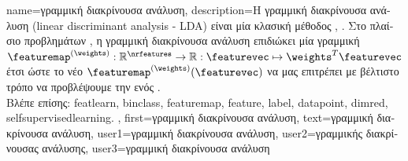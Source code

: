 {name={\foreignlanguage{greek}{γραμμική διακρίνουσα ανάλυση}}, 
	description={\foreignlanguage{greek}{Η γραμμική διακρίνουσα ανάλυση} 
		(linear discriminant analysis - LDA) \foreignlanguage{greek}{είναι μία κλασική μέθοδος}  
		\cite{BishopBook}, \cite{Fisher1936Taxonomic}. 
		\foreignlanguage{greek}{Στο πλαίσιο προβλημάτων} , \foreignlanguage{greek}{η γραμμική διακρίνουσα ανάλυση 
		επιδιώκει μία γραμμική}  $\featuremap^{(\weights)}: \mathbb{R}^{\nrfeatures} 
		\rightarrow \mathbb{R}: \featurevec \mapsto \weights^{T} \featurevec$ \foreignlanguage{greek}{έτσι ώστε το νέο}
		 $\featuremap^{(\weights)}(\featurevec)$ \foreignlanguage{greek}{να μας επιτρέπει με βέλτιστο τρόπο να 
		προβλέψουμε την}  \foreignlanguage{greek}{ενός} . 
		\\
		\foreignlanguage{greek}{Βλέπε επίσης:} \gls{featlearn}, \gls{binclass}, \gls{featuremap}, \gls{feature}, \gls{label}, \gls{datapoint}, 
		\gls{dimred}, \gls{selfsupervisedlearning}. }, 
 	first={\foreignlanguage{greek}{γραμμική διακρίνουσα ανάλυση}},
 	text={\foreignlanguage{greek}{γραμμική διακρίνουσα ανάλυση}},
	user1={\foreignlanguage{greek}{γραμμική διακρίνουσα ανάλυση}}, %
	user2={\foreignlanguage{greek}{γραμμικής διακρίνουσας ανάλυσης}}, %
	user3={\foreignlanguage{greek}{γραμμική διακρίνουσα ανάλυση}} %
}


